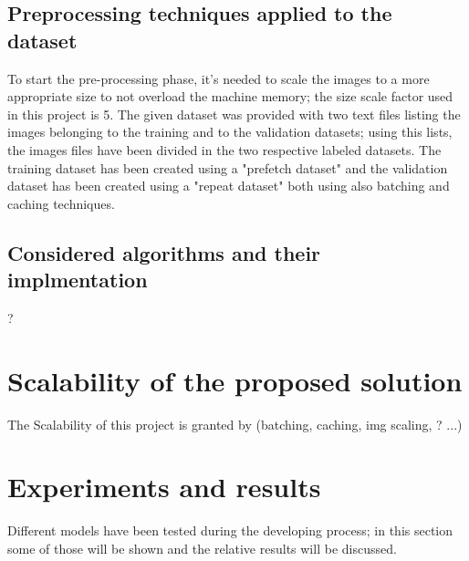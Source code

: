 \documentclass[a4paper,12pt]{article}
\begin{document}
\newpage
\subsection{Preprocessing techniques applied to the dataset}
To start the pre-processing phase, it's needed to scale the images to a more appropriate size to not overload the machine memory; the size scale factor used in this project is 5.
The given dataset was provided with two text files listing the images belonging to the training and to the validation datasets; using this lists, the images files have been divided in the
two respective labeled datasets. 
The training dataset has been created using a "prefetch dataset" and the validation dataset has been created using a "repeat dataset" both using also batching and caching techniques.


\newpage
\subsection{Considered algorithms and their implmentation}
?

\newpage
\section{Scalability of the proposed solution}
The Scalability of this project is granted by (batching, caching, img scaling, ? ...) 

\newpage
\section{Experiments and results}
Different models have been tested during the developing process; in this section some of those will be shown and the relative results will be discussed.
\end{document}
